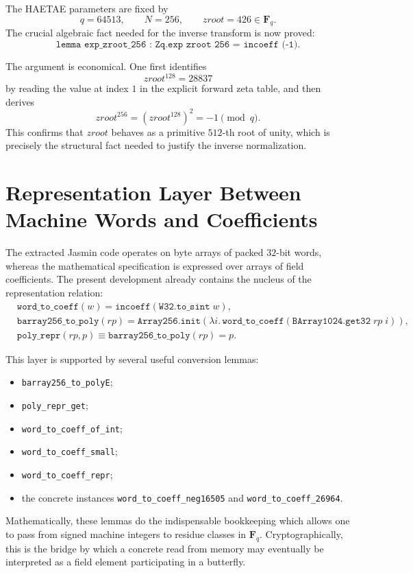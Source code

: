 \documentclass[11pt]{article}
\begin{document}
The HAETAE parameters are fixed by
\[
q = 64513,\qquad N = 256,\qquad zroot = 426 \in \mathbf{F}_q.
\]
The crucial algebraic fact needed for the inverse transform is now proved:
\[
\texttt{lemma exp\_zroot\_256 : Zq.exp zroot 256 = incoeff (-1)}.
\]

The argument is economical. One first identifies
\[
zroot^{128} = 28837
\]
by reading the value at index \(1\) in the explicit forward zeta table, and
then derives
\[
zroot^{256} = (zroot^{128})^2 = -1 \pmod q.
\]
This confirms that \(zroot\) behaves as a primitive \(512\)-th root of unity,
which is precisely the structural fact needed to justify the inverse
normalization.

\section{Representation Layer Between Machine Words and Coefficients}

The extracted Jasmin code operates on byte arrays of packed \(32\)-bit words,
whereas the mathematical specification is expressed over arrays of field
coefficients. The present development already contains the nucleus of the
representation relation:
\begin{align*}
&\texttt{word\_to\_coeff}(w) = \texttt{incoeff}(\texttt{W32.to\_sint}\; w),\\
&\texttt{barray256\_to\_poly}(rp) =
  \texttt{Array256.init}(\lambda i.\,\texttt{word\_to\_coeff}(\texttt{BArray1024.get32}\; rp\; i)),\\
&\texttt{poly\_repr}(rp,p) \equiv \texttt{barray256\_to\_poly}(rp) = p.
\end{align*}

This layer is supported by several useful conversion lemmas:
\begin{itemize}
\item \texttt{barray256\_to\_polyE};
\item \texttt{poly\_repr\_get};
\item \texttt{word\_to\_coeff\_of\_int};
\item \texttt{word\_to\_coeff\_small};
\item \texttt{word\_to\_coeff\_repr};
\item the concrete instances \texttt{word\_to\_coeff\_neg16505} and \texttt{word\_to\_coeff\_26964}.
\end{itemize}

Mathematically, these lemmas do the indispensable bookkeeping which allows one
to pass from signed machine integers to residue classes in \(\mathbf{F}_q\).
Cryptographically, this is the bridge by which a concrete read from memory may
eventually be interpreted as a field element participating in a butterfly.
\end{document}
